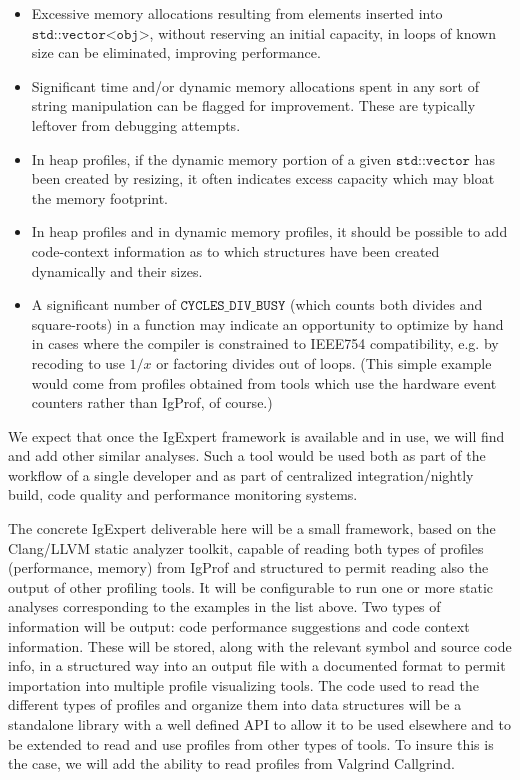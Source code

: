 \documentclass[notitlepage,letter,12pt]{article}
\begin{document}
\begin{itemize}
\item Excessive memory allocations resulting from elements inserted into 
      $\texttt{std::vector<obj>}$, without reserving an initial capacity, 
      in loops of known size can be eliminated, improving performance.
\item Significant time and/or dynamic memory allocations spent in any sort of
string manipulation can be flagged for improvement. These are typically 
leftover from debugging attempts.
\item In heap profiles, if the dynamic memory portion of a given $\texttt{std::vector}$ has been created by resizing, it often indicates excess capacity 
which may bloat the memory footprint.
\item In heap profiles and in dynamic memory profiles, it should be
possible to add code-context information as to which structures have
been created dynamically and their sizes. 
\item A significant number of $\texttt{CYCLES\_DIV\_BUSY}$ (which counts
      both divides
      and square-roots) in a function may indicate an opportunity to 
      optimize by hand in cases where the compiler is constrained to
      IEEE754 compatibility, e.g. by recoding to use $1/x$ or factoring
      divides out of loops. (This simple example would come from profiles 
      obtained from tools which use the hardware event counters rather than 
      IgProf, of course.)
\end{itemize}

We expect that once the IgExpert framework is available and in use, we 
will find and add other similar analyses. Such a tool would be used both 
as part of the workflow of a single developer and as part of centralized 
integration/nightly build, code quality and performance monitoring systems.

The concrete IgExpert deliverable here will be a small framework, 
based on the Clang/LLVM static analyzer toolkit, capable of
reading both types of profiles (performance, memory) from IgProf and 
structured to permit reading also the output of other profiling tools.
It will be configurable to run one or more static analyses corresponding
to the examples in the list above. Two types of information will be
output: code performance suggestions and code context information. These 
will be stored, along with the relevant symbol and source code info, in a
structured way into an output file with a documented format to permit
importation into multiple profile visualizing tools. The code used
to read the different types of profiles and organize them into data
structures will be a standalone library with a well defined API to
allow it to be used elsewhere and to be extended to read and use profiles 
from other types of tools. To insure this is the case, we will add the
ability to read profiles from Valgrind Callgrind.
\end{document}
